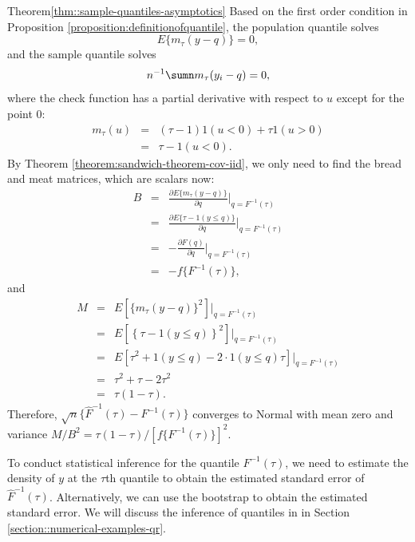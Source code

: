 \begin{myproof}{Theorem}{\ref{thm::sample-quantiles-asymptotics}}
Based on the first order condition in  Proposition \ref{proposition:definitionofquantile}, the population quantile solves
$$
E \{ m_\tau(y - q) \} =0,
$$
and the sample quantile solves
$$
n^{-1} \sumn m_\tau(y_i - q)  = 0,
$$
where the check function has a partial derivative with respect to
$u$ except for the point $0$: 
\begin{eqnarray*}
m_{\tau}(u) &=&  (\tau-1)1(u<0)+\tau1(u>0) \\
&=&\tau-1(u < 0).
\end{eqnarray*}
By Theorem \ref{theorem:sandwich-theorem-cov-iid},  we only need to find the bread and meat matrices, which are scalars now:
\begin{eqnarray*}
B &=& \frac{\partial   E \{ m_\tau(y - q) \}  }{ \partial q}\Big | _{q = F^{-1}(\tau)}\\
&=& \frac{\partial   E \{ \tau-1(y\leq q) \}  }{ \partial q}\Big | _{q =F^{-1}(\tau)}\\
&=& -\frac{\partial   F(q)   }{ \partial q}\Big | _{q =F^{-1}(\tau)}\\
&=& -f\{F^{-1}(\tau) \},
\end{eqnarray*}
and
\begin{eqnarray*}
M &=& E \left[ \{ m_\tau(y - q) \}^2 \right] \Big | _{q =F^{-1}(\tau)} \\
&=& E \left[ \left\{ \tau-1(y\leq q) \right\}^2 \right] \Big | _{q =F^{-1}(\tau)} \\
&=& E \left[ \tau^2 + 1(y\leq q) - 2\cdot  1(y\leq q) \tau \right] \Big | _{q =F^{-1}(\tau)} \\
&=& \tau^2 + \tau - 2\tau^2 \\
&=& \tau(1-\tau).
\end{eqnarray*}
Therefore, $\sqrt{n}\{ \hat{F}^{-1}(\tau)-F^{-1}(\tau)\}$ converges to Normal with mean zero and variance $M/B^2 = \tau(1-\tau)/ [f\{F^{-1}(\tau) \}]^2$. 
\end{myproof}



To conduct statistical inference for the quantile $F^{-1}(\tau)$, we need to estimate the density of $y$ at the $\tau$th quantile to obtain the estimated standard error of $\hat{F}^{-1}(\tau)$. Alternatively, we can use the bootstrap to obtain the estimated standard error. We will discuss the inference of quantiles in  in Section \ref{section::numerical-examples-qr}. 



